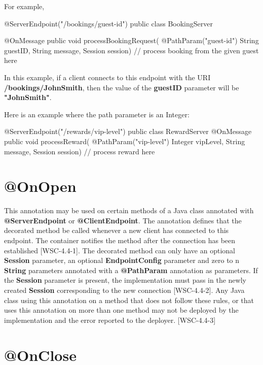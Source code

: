 For example,

\begin{listing}{1}
@ServerEndpoint("/bookings/{guest-id}")
public class BookingServer {

  @OnMessage
  public void processBookingRequest(
      @PathParam("guest-id") String guestID,
      String message,
      Session session) {
      // process booking from the given guest here
  }
}
\end{listing}

In this example, if a client connects to this endpoint with the URI \textbf{/bookings/JohnSmith}, then the value of the \textbf{guestID} parameter will be \textbf{"JohnSmith"}.

Here is an example where the path parameter is an Integer:

\begin{listing}{1}
@ServerEndpoint("/rewards/{vip-level}")
public class RewardServer {
    @OnMessage
    public void processReward(
            @PathParam("vip-level") Integer vipLevel,
            String message, Session session) {
        // process reward here
    }
}
\end{listing}

\section{@OnOpen}

This annotation may be used on certain methods of a Java class annotated with \textbf{@ServerEndpoint} or \textbf{@ClientEndpoint}. The annotation defines that the decorated method be called whenever a new client has connected to this endpoint. The container notifies the method after the connection has been established [WSC-4.4-1]. The decorated method can only have an optional \textbf{Session} parameter, an optional \textbf{EndpointConfig} parameter and zero to n \textbf{String} parameters annotated with a \textbf{@PathParam} annotation as parameters. If the \textbf{Session} parameter is present, the implementation must pass in the newly created \textbf{Session} corresponding to the new connection [WSC-4.4-2]. Any Java class using this annotation on a method that does not follow these rules, or that uses this annotation on more than one method may not be deployed by the implementation and the error reported to the deployer. [WSC-4.4-3]

\section{@OnClose}

